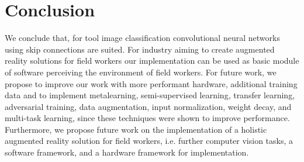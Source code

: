 \documentclass[a4paper, 10pt, journal]{wissarbIEEE}
\begin{document}
\section{Conclusion}
\label{sec:conclusion}
We conclude that, for tool image classification convolutional neural networks using skip connections are suited. For industry aiming to create augmented reality solutions for field workers our implementation can be used as basic module of software perceiving the environment of field workers. 
For future work, we propose to improve our work with more performant hardware, additional training data and to implement metalearning, semi-supervised learning, transfer learning, adversarial training, data augmentation, input normalization, weight decay, and multi-task learning, since these techniques were shown to improve performance. \cite{Pan.2010, Szegedy.2014, ElAmir.2020} 
Furthermore, we propose future work on the implementation of a holistic augmented reality solution for field workers, i.e. further computer vision tasks, a software framework, and a hardware framework for implementation.

\end{document}
